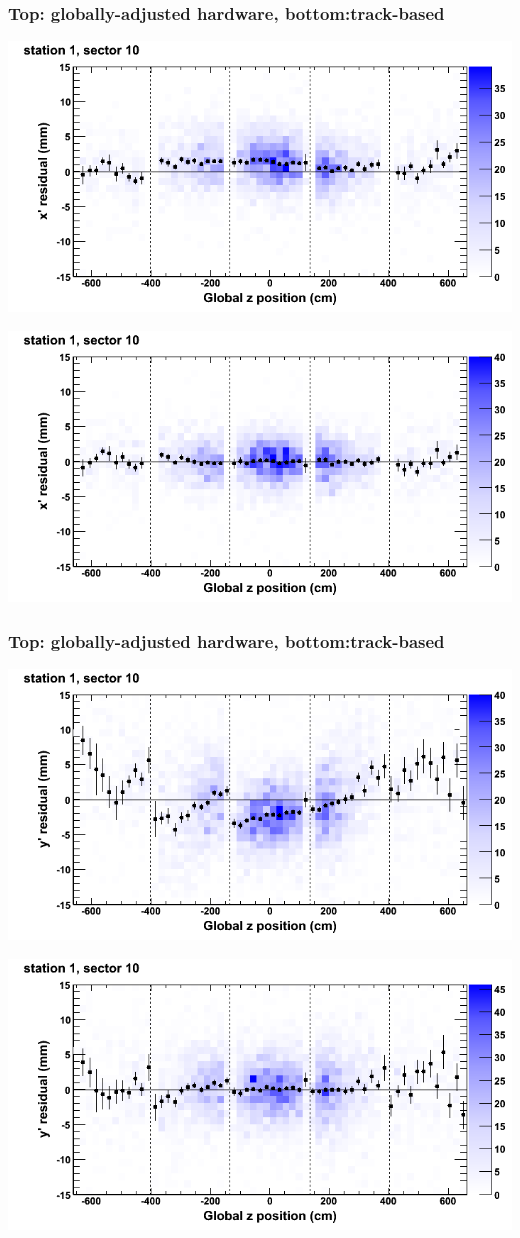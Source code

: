 \documentclass[compress]{beamer}
\begin{document}
\begin{frame}
\frametitle{Top: globally-adjusted hardware, bottom:track-based}
\includegraphics[width=0.7\linewidth]{NOV4_mapplots_HW/DTvsz_st1sec10_x.png}

\includegraphics[width=0.7\linewidth]{NOV4_mapplots/DTvsz_st1sec10_x.png}
\end{frame}

\begin{frame}
\frametitle{Top: globally-adjusted hardware, bottom:track-based}
\includegraphics[width=0.7\linewidth]{NOV4_mapplots_HW/DTvsz_st1sec10_y.png}

\includegraphics[width=0.7\linewidth]{NOV4_mapplots/DTvsz_st1sec10_y.png}
\end{frame}
\end{document}
